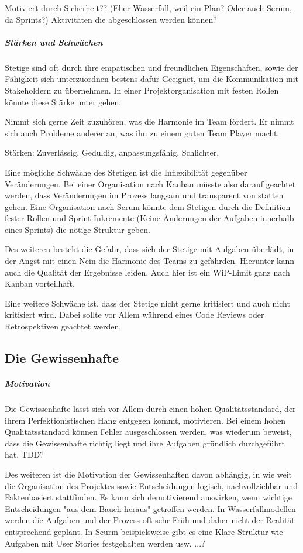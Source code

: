 \documentclass[twocolumn,10pt]{asme2ej}
\begin{document}
Motiviert durch  Sicherheit?? (Eher Wasserfall, weil ein Plan? Oder auch Scrum, da Sprints?)
Aktivitäten die abgeschlossen werden können? 

\subparagraph{Stärken und Schwächen}

Stetige sind oft durch ihre empatischen und freundlichen Eigenschaften, sowie der Fähigkeit sich unterzuordnen bestens dafür Geeignet, um die Kommunikation mit Stakeholdern zu übernehmen. In einer Projektorganisation mit festen Rollen könnte diese Stärke unter gehen.

Nimmt sich gerne Zeit zuzuhören, was die Harmonie im Team fördert. Er nimmt sich auch Probleme anderer an, was ihn zu einem guten Team Player macht.

Stärken: Zuverlässig. Geduldig, anpassungsfähig. Schlichter. 

Eine mögliche Schwäche des Stetigen ist die Inflexibilität gegenüber Veränderungen. Bei einer Organisation nach Kanban müsste also darauf geachtet werden, dass Veränderungen im Prozess langsam und transparent von statten gehen. Eine Organisation nach Scrum könnte dem Stetigen durch die Definition fester Rollen und Sprint-Inkremente (Keine Änderungen der Aufgaben innerhalb eines Sprints) die nötige Struktur geben.

Des weiteren besteht die Gefahr, dass sich der Stetige mit Aufgaben überlädt, in der Angst mit einen Nein die Harmonie des Teams zu gefährden. Hierunter kann auch die Qualität der Ergebnisse leiden. Auch hier ist ein WiP-Limit ganz nach Kanban vorteilhaft.
 
Eine weitere Schwäche ist, dass der Stetige nicht gerne kritisiert und auch nicht kritisiert wird. Dabei sollte vor Allem während eines Code Reviews oder Retrospektiven geachtet werden.
 


\subsection{Die Gewissenhafte}
\subparagraph{Motivation}

Die Gewissenhafte lässt sich vor Allem durch einen hohen Qualitätsstandard, der ihrem Perfektionistischen Hang entgegen kommt, motivieren. Bei einem hohen Qualitätsstandard können Fehler ausgeschlossen werden, was wiederum beweist, dass die Gewissenhafte richtig liegt und ihre Aufgaben gründlich durchgeführt hat. TDD? 

Des weiteren ist die Motivation der Gewissenhaften davon abhängig, in wie weit die Organisation des Projektes sowie Entscheidungen logisch, nachvollziehbar und Faktenbasiert stattfinden. Es kann sich demotivierend auswirken, wenn wichtige Entscheidungen "aus dem Bauch heraus" getroffen werden. In Wasserfallmodellen werden die Aufgaben und der Prozess oft sehr Früh und daher nicht der Realität entsprechend geplant. In Scurm beispielsweise gibt es eine Klare Struktur wie Aufgaben mit User Stories festgehalten werden usw. ...?
\end{document}
